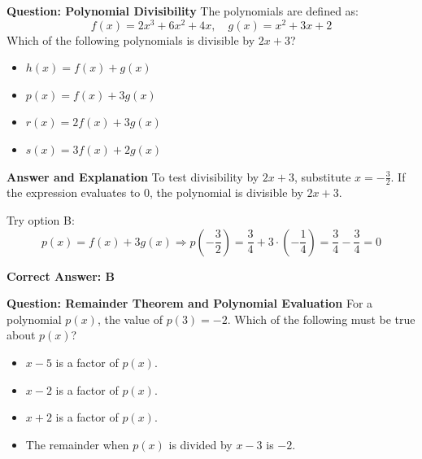\documentclass{beamer}
\begin{document}
\begin{frame}{\textbf{Question: Polynomial Divisibility}}
The polynomials are defined as:
\[
f(x) = 2x^3 + 6x^2 + 4x, \quad g(x) = x^2 + 3x + 2
\]
Which of the following polynomials is divisible by \( 2x + 3 \)?

\begin{itemize}
    \item[A.] \( h(x) = f(x) + g(x) \)
    \item[B.] \( p(x) = f(x) + 3g(x) \)
    \item[C.] \( r(x) = 2f(x) + 3g(x) \)
    \item[D.] \( s(x) = 3f(x) + 2g(x) \)
\end{itemize}
\end{frame}


\begin{frame}{\textbf{Answer and Explanation}}
To test divisibility by \( 2x + 3 \), substitute \( x = -\frac{3}{2} \). If the expression evaluates to 0, the polynomial is divisible by \( 2x + 3 \).



Try option B:
\[
p(x) = f(x) + 3g(x) \Rightarrow p\left(-\frac{3}{2}\right) = \frac{3}{4} + 3 \cdot \left(-\frac{1}{4}\right) = \frac{3}{4} - \frac{3}{4} = 0
\]

\textbf{Correct Answer: B}
\end{frame}

\begin{frame}{\textbf{Question: Remainder Theorem and Polynomial Evaluation}}
For a polynomial \( p(x) \), the value of \( p(3) = -2 \). Which of the following must be true about \( p(x) \)?

\begin{itemize}
    \item[A.] \( x - 5 \) is a factor of \( p(x) \).
    \item[B.] \( x - 2 \) is a factor of \( p(x) \).
    \item[C.] \( x + 2 \) is a factor of \( p(x) \).
    \item[D.] The remainder when \( p(x) \) is divided by \( x - 3 \) is \(-2\).
\end{itemize}
\end{frame}
\end{document}
